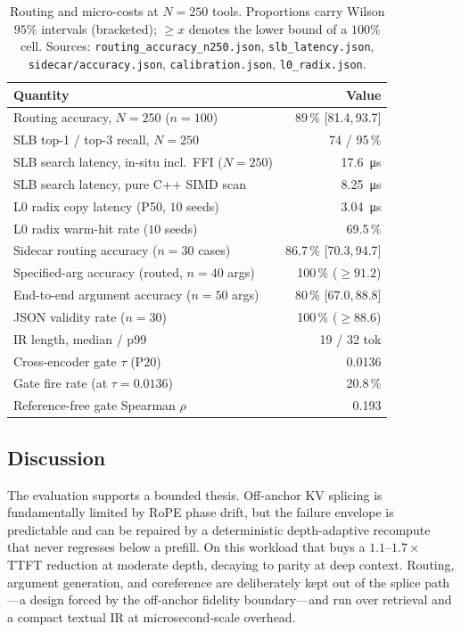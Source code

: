 \documentclass[10pt,conference]{IEEEtran}
\newcommand{\code}[1]{\texttt{\small #1}}
\begin{document}
\begin{table}[t]
\centering
\caption{Routing and micro-costs at $N{=}250$ tools. Proportions carry Wilson $95\%$ intervals
(bracketed); ${\ge}x$ denotes the lower bound of a $100\%$ cell. Sources:
\code{routing\_accuracy\_n250.json}, \code{slb\_latency.json}, \code{sidecar/accuracy.json},
\code{calibration.json}, \code{l0\_radix.json}.}
\label{tab:micro}
\footnotesize
\setlength{\tabcolsep}{3pt}
\begin{tabular}{lr}
\toprule
Quantity & Value \\
\midrule
Routing accuracy, $N{=}250$ ($n{=}100$)      & 89\,\% {\scriptsize[81.4,\,93.7]} \\
SLB top-1 / top-3 recall, $N{=}250$          & 74 / 95\,\% \\
SLB search latency, in-situ incl.\ FFI ($N{=}250$) & \SI{17.6}{\micro\second} \\
SLB search latency, pure C++ SIMD scan       & \SI{8.25}{\micro\second} \\
L0 radix copy latency (P50, $10$ seeds)      & \SI{3.04}{\micro\second} \\
L0 radix warm-hit rate ($10$ seeds)          & 69.5\,\% \\
Sidecar routing accuracy ($n{=}30$ cases)    & 86.7\,\% {\scriptsize[70.3,\,94.7]} \\
Specified-arg accuracy (routed, $n{=}40$ args) & 100\,\% {\scriptsize(${\ge}91.2$)} \\
End-to-end argument accuracy ($n{=}50$ args)  & 80\,\% {\scriptsize[67.0,\,88.8]} \\
JSON validity rate ($n{=}30$)                & 100\,\% {\scriptsize(${\ge}88.6$)} \\
IR length, median / p99                      & 19 / 32 tok \\
Cross-encoder gate $\tau$ (P20)              & 0.0136 \\
Gate fire rate (at $\tau{=}0.0136$)          & 20.8\,\% \\
Reference-free gate Spearman $\rho$          & 0.193 \\
\bottomrule
\end{tabular}
\end{table}

\subsection{Discussion}
The evaluation supports a bounded thesis. Off-anchor KV splicing is fundamentally limited by RoPE
phase drift, but the failure envelope is predictable and can be repaired by a deterministic
depth-adaptive recompute that never regresses below a prefill. On this workload that buys a
$1.1$--$1.7\times$ TTFT reduction at moderate depth, decaying to parity at deep context. Routing,
argument generation, and coreference are deliberately kept out of the splice path---a design forced
by the off-anchor fidelity boundary---and run over retrieval and a compact textual IR at
microsecond-scale overhead.
\end{document}
